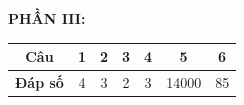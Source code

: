 \documentclass[11pt,a4paper]{article}
\begin{document}
\vspace{0.3cm}
\noindent\textbf{PHẦN III:}\\
\begin{tabular}{|c|c|c|c|c|c|c|}
\hline
\textbf{Câu} & \textbf{1} & \textbf{2} & \textbf{3} & \textbf{4} & \textbf{5} & \textbf{6} \\
\hline
\textbf{Đáp số} & 4 & 3 & 2 & 3 & 14000 & 85 \\
\hline
\end{tabular}
\end{document}
